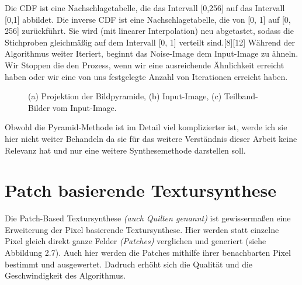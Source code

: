\documentclass[12pt, a4paper,twoside,openright]{report}
\begin{document}
Die CDF ist eine Nachschlagetabelle, die das Intervall {[0,256]} auf das Intervall {[0,1]} abbildet.
Die inverse CDF ist eine Nachschlagetabelle, die von {[0, 1]} auf {[0, 256]} zurückführt.
Sie wird {(mit linearer Interpolation)} neu abgetastet,
sodass die Stichproben gleichmäßig auf dem Intervall {[0, 1]} verteilt sind.{[8][12]}
\newline
Während der Algorithmus weiter Iteriert, beginnt das Noise-Image dem Input-Image zu ähneln.
Wir Stoppen die den Prozess, wenn wir eine ausreichende Ähnlichkeit erreicht haben oder wir eine von uns festgelegte Anzahl von Iterationen erreicht haben.

\begin{figure}[H]
    \centering
    \qquad
    \qquad
    \caption{(a) Projektion der Bildpyramide, (b) Input-Image, (c) Teilband-Bilder vom Input-Image.}%
\end{figure}

Obwohl die Pyramid-Methode ist im Detail viel komplizierter ist,
werde ich sie hier nicht weiter Behandeln da sie für das weitere Verständnis dieser Arbeit keine Relevanz hat und nur eine weitere Synthesemethode darstellen soll.

\section{Patch basierende Textursynthese}

Die Patch-Based Textursynthese \textit{(auch Quilten genannt)} ist gewissermaßen eine Erweiterung der Pixel basierende Textursynthese.
Hier werden statt einzelne Pixel gleich direkt ganze Felder \textit{(Patches)} verglichen und generiert {(siehe Abbildung 2.7)}.
Auch hier werden die Patches mithilfe ihrer benachbarten Pixel bestimmt und ausgewertet.
Dadruch erhöht sich die Qualität und die Geschwindigkeit des Algorithmus.
\end{document}
